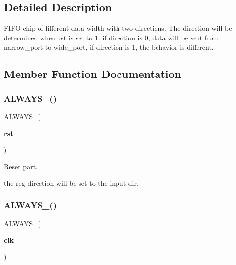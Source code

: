 \subsection{Detailed Description}
F\+I\+FO chip of fifferent data width with two directions. The direction will be determined when rst is set to 1. if direction is 0, data will be sent from narrow\+\_\+port to wide\+\_\+port, if direction is 1, the behavior is different. 

\subsection{Member Function Documentation}
\mbox{\label{enumfifo_aa8122a479ce4de857afe9320219cfa5a}} 
\subsubsection{\texorpdfstring{A\+L\+W\+A\+Y\+S\+\_()}{ALWAYS\_0()}}
{\footnotesize\ttfamily  {\bfseries \textcolor{vhdlchar}{ }} A\+L\+W\+A\+Y\+S\+\_(\begin{DoxyParamCaption}\item[{}]{{\bfseries \textcolor{vhdlchar}{rst}}   {\em {\bfseries \textcolor{vhdlchar}{ }}} }\end{DoxyParamCaption})\hspace{0.3cm}{\ttfamily [Always Construct]}}



Reset part. 

the reg direction will be set to the input dir. \mbox{\label{enumfifo_a45eb09cdeb334de587d997e4c9f2d6db}} 
\subsubsection{\texorpdfstring{A\+L\+W\+A\+Y\+S\+\_()}{ALWAYS\_1()}}
{\footnotesize\ttfamily  {\bfseries \textcolor{vhdlchar}{ }} A\+L\+W\+A\+Y\+S\+\_(\begin{DoxyParamCaption}\item[{}]{{\bfseries \textcolor{vhdlchar}{clk}}   {\em {\bfseries \textcolor{vhdlchar}{ }}} }\end{DoxyParamCaption})\hspace{0.3cm}{\ttfamily [Always Construct]}}



